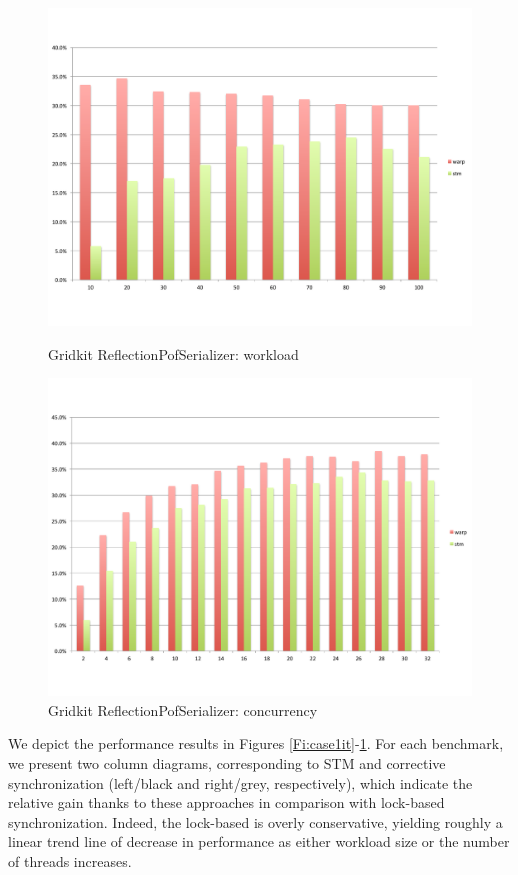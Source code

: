 \begin{figure}
\begin{minipage}{0.45 \textwidth}
		\includegraphics[width=\textwidth]{../../eval/32threads/case4it.pdf}
		\caption{\label{Fi:case4it}Gridkit {\sf ReflectionPofSerializer}: workload}
	\end{minipage}
	\hspace{0.1 \textwidth}
	\begin{minipage}{0.45 \textwidth}
		\includegraphics[width=\textwidth]{../../eval/32threads/case4th.pdf}
		\caption{\label{Fi:case4th}Gridkit {\sf ReflectionPofSerializer}: concurrency}
	\end{minipage}
\end{figure}



We depict the performance results in Figures \ref{Fi:case1it}-\ref{Fi:case4th}. 
For each benchmark, we present two column diagrams, corresponding to STM and corrective synchronization (left/black and right/grey, respectively), which indicate the relative gain thanks to these approaches in comparison with lock-based synchronization. Indeed, the lock-based is overly conservative, yielding roughly a linear trend line of decrease in performance as either workload size or the number of threads increases.

